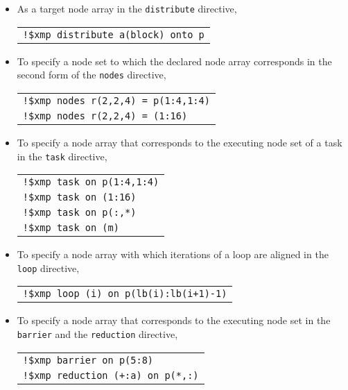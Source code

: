\begin{itemize}
\item As a target node array in the {\tt distribute} directive,

\begin{tabular}{l}
\verb|!$xmp distribute a(block) onto p| \\
\end{tabular}%

\item To specify a node set to which the declared node array corresponds
      in the second form of the {\tt nodes} directive,

\begin{tabular}{l}
\verb|!$xmp nodes r(2,2,4) = p(1:4,1:4)| \\
\verb|!$xmp nodes r(2,2,4) = (1:16)| \\
\end{tabular}

\item To specify a node array that corresponds to the executing node set
      of a task in the {\tt task} directive,

\begin{tabular}{l}
\verb|!$xmp task on p(1:4,1:4)| \\
\verb|!$xmp task on (1:16)| \\
\verb|!$xmp task on p(:,*)| \\
\verb|!$xmp task on (m)| \\
\end{tabular}

\item To specify a node array with which iterations of a loop are
      aligned in the {\tt loop} directive,


\begin{tabular}{l}
\verb|!$xmp loop (i) on p(lb(i):lb(i+1)-1)| \\
\end{tabular}%

\item To specify a node array that corresponds to the executing node set
      in the {\tt barrier} and the {\tt reduction} directive,


\begin{tabular}{l}
\verb|!$xmp barrier on p(5:8)| \\
\verb|!$xmp reduction (+:a) on p(*,:)| \\
\end{tabular}


\end{itemize}

